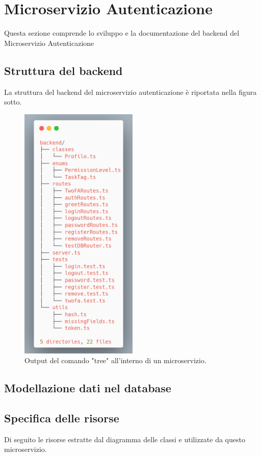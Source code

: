 \documentclass{report}
\begin{document}
\section{Microservizio Autenticazione}

Questa sezione comprende lo sviluppo e la documentazione del backend del Microservizio Autenticazione
\subsection*{Struttura del backend}
La struttura del backend del microservizio autenticazione è riportata
nella figura sotto. 
\begin{figure}[H]
	\centering\includegraphics[width=0.5\textwidth]{images/microservizio-autenticazione/backend-structure.png}
	\caption{Output del comando "tree" all'interno di un microservizio.}
\end{figure}

\subsection*{Modellazione dati nel database}

\subsection*{Specifica delle risorse}
Di seguito le risorse estratte dal diagramma delle classi e utilizzate da questo microservizio.
\end{document}
